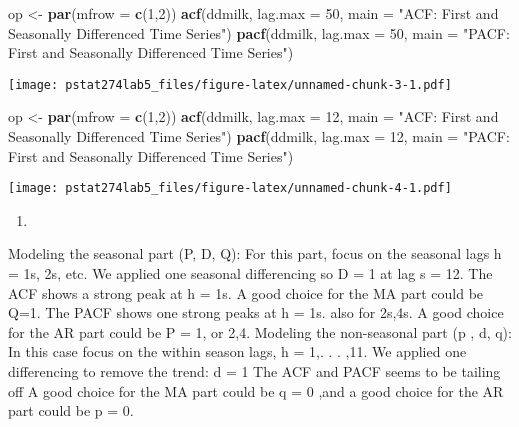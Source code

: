 \documentclass[
]{article}
\newenvironment{Shaded}{\begin{snugshade}}{\end{snugshade}}
\newcommand{\AttributeTok}[1]{\textcolor[rgb]{0.13,0.29,0.53}{#1}}
\newcommand{\DecValTok}[1]{\textcolor[rgb]{0.00,0.00,0.81}{#1}}
\newcommand{\FunctionTok}[1]{\textcolor[rgb]{0.13,0.29,0.53}{\textbf{#1}}}
\newcommand{\NormalTok}[1]{#1}
\newcommand{\OtherTok}[1]{\textcolor[rgb]{0.56,0.35,0.01}{#1}}
\newcommand{\StringTok}[1]{\textcolor[rgb]{0.31,0.60,0.02}{#1}}
\providecommand{\tightlist}{%
  \setlength{\itemsep}{0pt}\setlength{\parskip}{0pt}}
\begin{document}
\begin{Shaded}
\begin{Highlighting}[]
\NormalTok{op }\OtherTok{\textless{}{-}} \FunctionTok{par}\NormalTok{(}\AttributeTok{mfrow =} \FunctionTok{c}\NormalTok{(}\DecValTok{1}\NormalTok{,}\DecValTok{2}\NormalTok{))}
\FunctionTok{acf}\NormalTok{(ddmilk, }\AttributeTok{lag.max =} \DecValTok{50}\NormalTok{, }\AttributeTok{main =} \StringTok{"ACF: First and Seasonally Differenced Time Series"}\NormalTok{)}
\FunctionTok{pacf}\NormalTok{(ddmilk, }\AttributeTok{lag.max =} \DecValTok{50}\NormalTok{, }\AttributeTok{main =} \StringTok{"PACF: First and Seasonally Differenced Time Series"}\NormalTok{)}
\end{Highlighting}
\end{Shaded}

\texttt{[image: pstat274lab5\_files/figure-latex/unnamed-chunk-3-1.pdf]}

\begin{Shaded}
\begin{Highlighting}[]
\NormalTok{op }\OtherTok{\textless{}{-}} \FunctionTok{par}\NormalTok{(}\AttributeTok{mfrow =} \FunctionTok{c}\NormalTok{(}\DecValTok{1}\NormalTok{,}\DecValTok{2}\NormalTok{))}
\FunctionTok{acf}\NormalTok{(ddmilk, }\AttributeTok{lag.max =} \DecValTok{12}\NormalTok{, }\AttributeTok{main =} \StringTok{"ACF: First and Seasonally Differenced Time Series"}\NormalTok{)}
\FunctionTok{pacf}\NormalTok{(ddmilk, }\AttributeTok{lag.max =} \DecValTok{12}\NormalTok{, }\AttributeTok{main =} \StringTok{"PACF: First and Seasonally Differenced Time Series"}\NormalTok{)}
\end{Highlighting}
\end{Shaded}

\texttt{[image: pstat274lab5\_files/figure-latex/unnamed-chunk-4-1.pdf]}

\begin{enumerate}
\def\labelenumi{(\alph{enumi})}
\setcounter{enumi}{2}
\tightlist
\item
\end{enumerate}

Modeling the seasonal part (P, D, Q): For this part, focus on the
seasonal lags h = 1s, 2s, etc. We applied one seasonal differencing so D
= 1 at lag s = 12. The ACF shows a strong peak at h = 1s. A good choice
for the MA part could be Q=1. The PACF shows one strong peaks at h = 1s.
also for 2s,4s. A good choice for the AR part could be P = 1, or 2,4.
Modeling the non-seasonal part (p , d, q): In this case focus on the
within season lags, h = 1,. . . ,11. We applied one differencing to
remove the trend: d = 1 The ACF and PACF seems to be tailing off A good
choice for the MA part could be q = 0 ,and a good choice for the AR part
could be p = 0.
\end{document}
